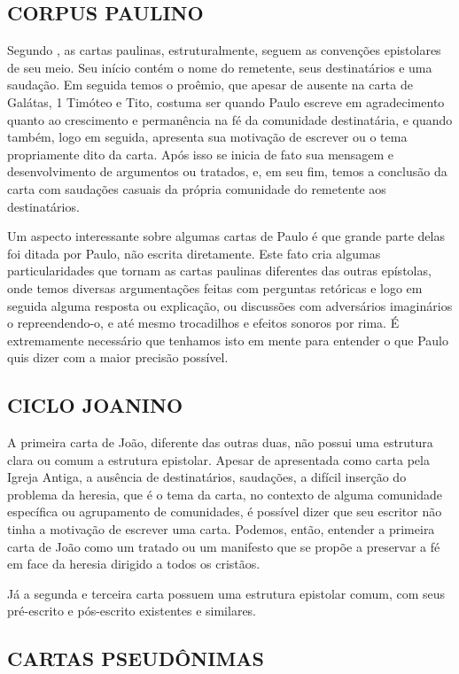 \documentclass[
    article,            %
	12pt,				%
	oneside,			%
	a4paper,			%
	chapter=TITLE,		%
	section=TITLE,		%
	english,			%
	french,				%
	spanish,			%
	brazil				%
	]{abntex2}
\begin{document}
\subsection{CORPUS PAULINO}
Segundo , as cartas paulinas, estruturalmente, seguem as convenções epistolares de seu meio. Seu início contém o nome do remetente, seus destinatários e uma saudação. Em seguida temos o proêmio, que apesar de ausente na carta de Galátas, 1 Timóteo e Tito, costuma ser quando Paulo escreve em agradecimento quanto ao crescimento e permanência na fé da comunidade destinatária, e quando também, logo em seguida, apresenta sua motivação de escrever ou o tema propriamente dito da carta. Após isso se inicia de fato sua mensagem e desenvolvimento de argumentos ou tratados, e, em seu fim, temos a conclusão da carta com saudações casuais da própria comunidade do remetente aos destinatários.

Um aspecto interessante sobre algumas cartas de Paulo é que grande parte delas foi ditada por Paulo, não escrita diretamente. Este fato cria algumas particularidades que tornam as cartas paulinas diferentes das outras epístolas, onde temos diversas argumentações feitas com perguntas retóricas e logo em seguida alguma resposta ou explicação, ou discussões com adversários imaginários o repreendendo-o, e até mesmo trocadilhos e efeitos sonoros por rima. É extremamente necessário que tenhamos isto em mente para entender o que Paulo quis dizer com a maior precisão possível.

\subsection{CICLO JOANINO}
A primeira carta de João, diferente das outras duas, não possui uma estrutura clara ou comum a estrutura epistolar. Apesar de apresentada como carta pela Igreja Antiga, a ausência de destinatários, saudações, a difícil inserção do problema da heresia, que é o tema da carta, no contexto de alguma comunidade específica ou agrupamento de comunidades, é possível dizer que seu escritor não tinha a motivação de escrever uma carta. Podemos, então, entender a primeira carta de João como um tratado ou um manifesto que se propõe a preservar a fé em face da heresia dirigido a todos os cristãos.

Já a segunda e terceira carta possuem uma estrutura epistolar comum, com seus pré-escrito e pós-escrito existentes e similares.
\subsection{CARTAS PSEUDÔNIMAS}
\end{document}
